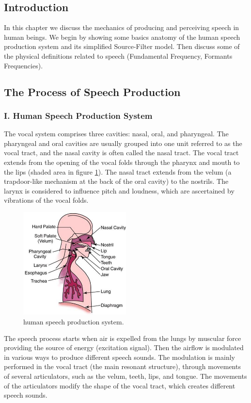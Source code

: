 \documentclass[12pt, a4paper, twoside]{report}
\begin{document}
\subsection{Introduction}
In this chapter we discuss the mechanics of producing and perceiving speech in human beings. We begin by showing some basics anatomy of the human speech production system and its simplified Source-Filter model. Then discuss some of the physical definitions related to speech (Fundamental Frequency, Formants Frequencies).
\subsection{The Process of Speech Production}
\subsubsection{I. Human Speech Production System}
 The vocal system comprises three cavities: nasal, oral, and pharyngeal. The pharyngeal and oral cavities are usually grouped into one unit referred to as the vocal tract, and the nasal cavity is often called the nasal tract. The vocal tract extends from the opening of the vocal folds through the pharynx and mouth to the lips (shaded area in figure \ref{fig:human-speech-prod}). The nasal tract extends from the velum (a trapdoor-like mechanism at the back of the oral cavity) to the nostrils. The larynx is considered to influence pitch and loudness, which are ascertained by vibrations of the vocal folds.

\begin{figure}[ht]
	\centering
	\includegraphics[width=0.5\textwidth]
	{images/chapter2/human-speech-prod}
	\caption{human speech production system.}
	\label{fig:human-speech-prod}
\end{figure}

The speech process starts when air is expelled from the lungs by muscular force providing the source of energy (excitation signal). Then the airflow is modulated in various ways to produce different speech sounds. The modulation is mainly performed in the vocal tract (the main resonant structure), through movements of several articulators, such as the velum, teeth, lips, and tongue. The movements of the articulators modify the shape of the vocal tract, which creates different speech sounds.
\end{document}
